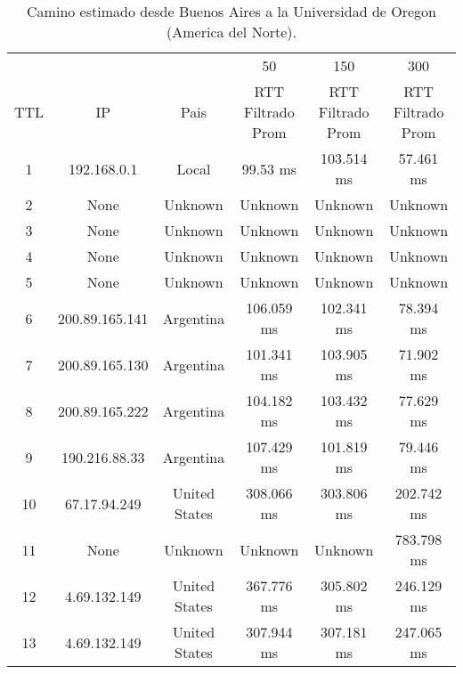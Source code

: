 \begin{table}[]
\centering
\caption{Camino estimado desde Buenos Aires a la Universidad de Oregon (America del Norte).}
\begin{tabular}{ | c | c | c | c | c | c | }
	\hline 
  & & & 50	& 150	& 300 \\ %
TTL	&          IP         	     &    Pais        & 	 RTT Filtrado Prom  	&  RTT Filtrado Prom  & 	 RTT Filtrado Prom  \\ \hline  
1	& 192.168.0.1       &   	       Local      &   	       99.53 ms    &  	     103.514 ms   &   	      57.461 ms   \\ \hline    
2	& None               &  	      Unknown     &   	      Unknown      &  	      Unknown     &   	      Unknown     \\ \hline    
3	& None               &  	      Unknown     &   	      Unknown      &  	      Unknown     &   	      Unknown     \\ \hline    
4	& None               &  	      Unknown     &   	      Unknown      &  	      Unknown     &   	      Unknown     \\ \hline    
5	& None               &  	      Unknown     &   	      Unknown      &  	      Unknown     &   	      Unknown     \\ \hline    
6	& 200.89.165.141    &   	     Argentina    &   	     106.059 ms    &  	     102.341 ms   &   	      78.394 ms   \\ \hline    
7	& 200.89.165.130    &   	     Argentina    &   	     101.341 ms    &  	     103.905 ms   &   	      71.902 ms   \\ \hline    
8	& 200.89.165.222    &   	     Argentina    &   	     104.182 ms    &  	     103.432 ms   &   	      77.629 ms   \\ \hline    
9	& 190.216.88.33     &   	     Argentina    &   	     107.429 ms    &  	     101.819 ms   &   	      79.446 ms   \\ \hline    
10	& 67.17.94.249     &    	   United States  &   	     308.066 ms    &  	     303.806 ms   &   	     202.742 ms   \\ \hline    
11	& None               &  	      Unknown     &   	      Unknown      &  	      Unknown     &   	     783.798 ms   \\ \hline    
12	& 4.69.132.149    &     	   United States  &   	     367.776 ms    &  	     305.802 ms   &   	     246.129 ms   \\ \hline    
13	& 4.69.132.149    &     	   United States  &   	     307.944 ms    &  	     307.181 ms   &   	     247.065 ms   \\ \hline    

\end{tabular}
\end{table}
